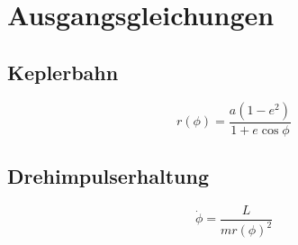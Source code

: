 \section{Ausgangsgleichungen}
\subsection{Keplerbahn}
\[
r(\phi) = \frac{a(1 - e^2)}{1 + e \cos \phi}
\]

\subsection{Drehimpulserhaltung}
\[
\dot{\phi} = \frac{L}{m r(\phi)^2}
\]
